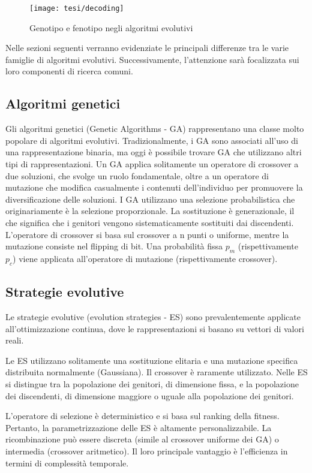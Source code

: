 \begin{figure}[!ht] 
    \centering 
    \texttt{[image: tesi/decoding]} 
    \caption{Genotipo e fenotipo negli algoritmi evolutivi}
\end{figure}

Nelle sezioni seguenti verranno evidenziate le principali differenze tra le varie famiglie di algoritmi evolutivi. Successivamente, l'attenzione sarà focalizzata sui loro componenti di ricerca comuni.

\subsection{Algoritmi genetici}

Gli algoritmi genetici (Genetic Algorithms - GA) rappresentano una classe molto popolare di algoritmi evolutivi. Tradizionalmente, i GA sono associati all'uso di una rappresentazione binaria, ma oggi è possibile trovare GA che utilizzano altri tipi di rappresentazioni. Un GA applica solitamente un operatore di crossover a due soluzioni, che svolge un ruolo fondamentale, oltre a un operatore di mutazione che modifica casualmente i contenuti dell'individuo per promuovere la diversificazione delle soluzioni. I GA utilizzano una selezione probabilistica che originariamente è la selezione proporzionale. La sostituzione è generazionale, il che significa che i genitori vengono sistematicamente sostituiti dai discendenti. L'operatore di crossover si basa sul crossover a n punti o uniforme, mentre la mutazione consiste nel flipping di bit. Una probabilità fissa $p_m$ (rispettivamente $p_c$) viene applicata all'operatore di mutazione (rispettivamente crossover).

\subsection{Strategie evolutive}

Le strategie evolutive (evolution strategies - ES) sono prevalentemente applicate all'ottimizzazione continua, dove le rappresentazioni si basano su vettori di valori reali.

Le ES utilizzano solitamente una sostituzione elitaria e una mutazione specifica distribuita normalmente (Gaussiana). Il crossover è raramente utilizzato. Nelle ES si distingue tra la popolazione dei genitori, di dimensione fissa, e la popolazione dei discendenti, di dimensione maggiore o uguale alla popolazione dei genitori. 

L'operatore di selezione è deterministico e si basa sul ranking della fitness. Pertanto, la parametrizzazione delle ES è altamente personalizzabile. La ricombinazione può essere discreta (simile al crossover uniforme dei GA) o intermedia (crossover aritmetico). Il loro principale vantaggio è l'efficienza in termini di complessità temporale.

